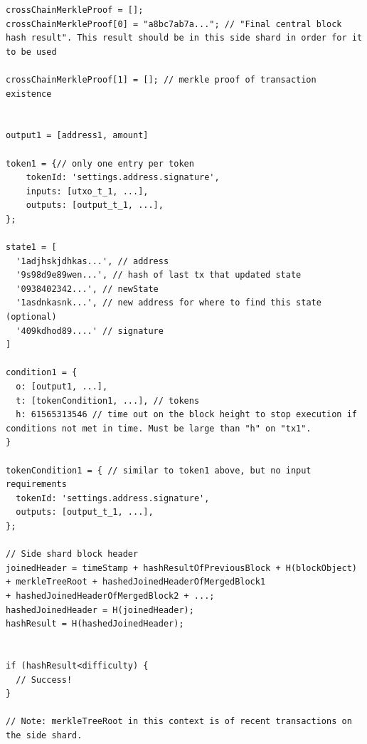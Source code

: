 \documentclass[a4paper,12pt]{article}
\begin{document}
\begin{lstlisting}
crossChainMerkleProof = [];
crossChainMerkleProof[0] = "a8bc7ab7a..."; // "Final central block hash result". This result should be in this side shard in order for it to be used

crossChainMerkleProof[1] = []; // merkle proof of transaction existence


output1 = [address1, amount]

token1 = {// only one entry per token
    tokenId: 'settings.address.signature',
    inputs: [utxo_t_1, ...],
    outputs: [output_t_1, ...],
};
    
state1 = [ 
  '1adjhskjdhkas...', // address
  '9s98d9e89wen...', // hash of last tx that updated state
  '0938402342...', // newState
  '1asdnkasnk...', // new address for where to find this state (optional)
  '409kdhod89....' // signature
]

condition1 = {
  o: [output1, ...],
  t: [tokenCondition1, ...], // tokens
  h: 61565313546 // time out on the block height to stop execution if conditions not met in time. Must be large than "h" on "tx1". 
}

tokenCondition1 = { // similar to token1 above, but no input requirements
  tokenId: 'settings.address.signature',
  outputs: [output_t_1, ...],
};

// Side shard block header
joinedHeader = timeStamp + hashResultOfPreviousBlock + H(blockObject)
+ merkleTreeRoot + hashedJoinedHeaderOfMergedBlock1
+ hashedJoinedHeaderOfMergedBlock2 + ...;
hashedJoinedHeader = H(joinedHeader);
hashResult = H(hashedJoinedHeader);


if (hashResult<difficulty) {
  // Success!
}

// Note: merkleTreeRoot in this context is of recent transactions on the side shard.

\end{lstlisting}
\end{document}
